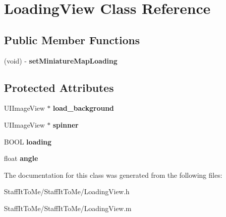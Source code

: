 \hypertarget{interface_loading_view}{
\section{\-Loading\-View \-Class \-Reference}
\label{interface_loading_view}
}
\subsection*{\-Public \-Member \-Functions}
\begin{DoxyCompactItemize}
\item 
\hypertarget{interface_loading_view_a0f98ec68f39cb73fd0fd600faceaa7b8}{
(void) -\/ {\bfseries set\-Miniature\-Map\-Loading}}
\label{interface_loading_view_a0f98ec68f39cb73fd0fd600faceaa7b8}

\end{DoxyCompactItemize}
\subsection*{\-Protected \-Attributes}
\begin{DoxyCompactItemize}
\item 
\hypertarget{interface_loading_view_aac93f105aa23302a77bf4fcc0f94e492}{
\-U\-I\-Image\-View $\ast$ {\bfseries load\-\_\-background}}
\label{interface_loading_view_aac93f105aa23302a77bf4fcc0f94e492}

\item 
\hypertarget{interface_loading_view_ae10ff0999c63449d31637df8b2c3eac0}{
\-U\-I\-Image\-View $\ast$ {\bfseries spinner}}
\label{interface_loading_view_ae10ff0999c63449d31637df8b2c3eac0}

\item 
\hypertarget{interface_loading_view_a365c5b017ec279eda126cb39d3bfdad4}{
\-B\-O\-O\-L {\bfseries loading}}
\label{interface_loading_view_a365c5b017ec279eda126cb39d3bfdad4}

\item 
\hypertarget{interface_loading_view_a9de8e2fbbf889831d08a46ca6ad29e8a}{
float {\bfseries angle}}
\label{interface_loading_view_a9de8e2fbbf889831d08a46ca6ad29e8a}

\end{DoxyCompactItemize}


\-The documentation for this class was generated from the following files\-:\begin{DoxyCompactItemize}
\item 
\-Staff\-It\-To\-Me/\-Staff\-It\-To\-Me/\-Loading\-View.\-h\item 
\-Staff\-It\-To\-Me/\-Staff\-It\-To\-Me/\-Loading\-View.\-m\end{DoxyCompactItemize}
